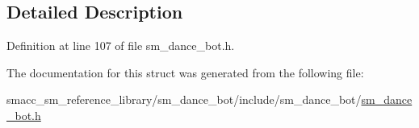 \subsection{Detailed Description}


Definition at line 107 of file sm\+\_\+dance\+\_\+bot.\+h.



The documentation for this struct was generated from the following file\+:\begin{DoxyCompactItemize}
\item 
smacc\+\_\+sm\+\_\+reference\+\_\+library/sm\+\_\+dance\+\_\+bot/include/sm\+\_\+dance\+\_\+bot/\hyperlink{sm__dance__bot_8h}{sm\+\_\+dance\+\_\+bot.\+h}\end{DoxyCompactItemize}
